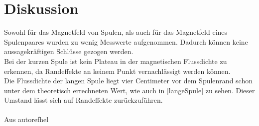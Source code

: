 \section{Diskussion}
\label{sec:Diskussion}

Sowohl für das Magnetfeld von Spulen, als auch für das Magnetfeld eines Spulenpaares wurden zu wenig Messwerte aufgenommen.
Dadurch können keine aussagekräftigen Schlüsse gezogen werden.\\
Bei der kurzen Spule ist kein Plateau in der magnetischen Flussdichte zu erkennen, da Randeffekte an keinem
Punkt vernachlässigt werden können. \\
Die Flussdichte der langen Spule liegt vier Centimeter vor dem Spulenrand schon unter dem theoretisch errechneten Wert, wie auch in
\autoref{langeSpule} zu sehen. Dieser Umstand lässt sich auf Randeffekte zurückzuführen.\\
\\
Aus autoref{hel}


\newpage